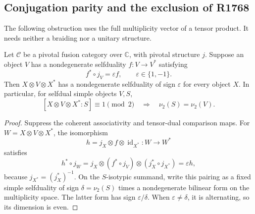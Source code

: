 
\subsection{Conjugation parity and the exclusion of R1768}
\label{subsec:r1768-conjugation-exclusion}

The following obstruction uses the full multiplicity vector of a tensor
product.  It needs neither a braiding nor a unitary structure.

\begin{lemma}
\label{lem:pivotal-conjugation-parity}
Let $\mathcal C$ be a pivotal fusion category over $\mathbb C$, with
pivotal structure $j$.  Suppose an object $V$ has a nondegenerate
selfduality $f:V\to V^*$ satisfying
\[
 f^*\circ j_V=\varepsilon f,\qquad \varepsilon\in\{1,-1\}.
\]
Then $X\otimes V\otimes X^*$ has a nondegenerate selfduality of sign
$\varepsilon$ for every object $X$.  In particular, for selfdual simple
objects $V,S$,
\[
 [X\otimes V\otimes X^*:S]\equiv1\pmod2
 \quad\Longrightarrow\quad
 \nu_2(S)=\nu_2(V).
\]
\end{lemma}
\begin{proof}
Suppress the coherent associativity and tensor-dual comparison maps.
For $W=X\otimes V\otimes X^*$, the isomorphism
\[
 h=j_X\otimes f\otimes\operatorname{id}_{X^*}:W\longrightarrow W^*
\]
satisfies
\[
 h^*\circ j_W
 =j_X\otimes(f^*\circ j_V)
       \otimes(j_X^*\circ j_{X^*})
 =\varepsilon h,
\]
because $j_{X^*}=(j_X^*)^{-1}$.
On the $S$-isotypic summand, write this pairing as a fixed simple
selfduality of sign $\delta=\nu_2(S)$ times a nondegenerate bilinear form
on the multiplicity space.  The latter form has sign
$\varepsilon/\delta$.  When $\varepsilon\ne\delta$, it is alternating,
so its dimension is even.
\end{proof}

